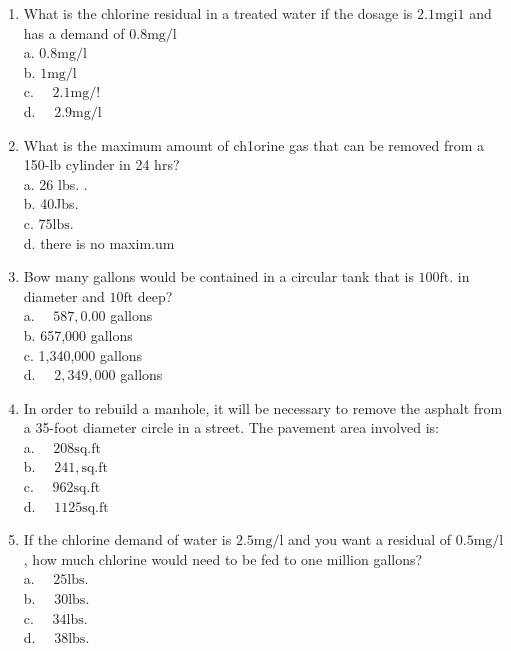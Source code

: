 \documentclass{article}
\begin{document}
\begin{enumerate}
\item What is the chlorine residual in a treated water if the dosage is $2.1 \mathrm{mgi1}$ and has a demand of $0.8 \mathrm{mg} / \mathrm{l}$\\
a. $0.8 \mathrm{mg} / \mathrm{l}$\\
b. $1 \mathrm{mg} / \mathrm{l}$\\
c. $\quad 2.1 \mathrm{mg} / !$\\
d. $\quad 2.9 \mathrm{mg} / \mathrm{l}$\\

\item What is the maximum amount of ch1orine gas that can be removed from a 150-lb cylinder in 24 hrs?\\
a. 26 lbs. .\\
b. 40Jbs.\\
c. $75 \mathrm{lbs}$.\\
d. there is no maxim.um\\

\item Bow many gallons would be contained in a circular tank that is $100 \mathrm{ft}$. in diameter and $10 \mathrm{ft}$ deep?\\
a. $\quad 587,0.00$ gallons\\
b. 657,000 gallons\\
c. 1,340,000 gallons\\
d. $\quad 2,349,000$ gallons\\


\item In order to rebuild a manhole, it will be necessary to remove the asphalt from a 35-foot diameter circle in a street. The pavement area involved is:\\
a. $\quad 208 \mathrm{sq. ft}$\\
b. $\quad 241, \mathrm{sq. ft}$\\
c. $\quad 962 \mathrm{sq. ft}$\\
d. $\quad 1125 \mathrm{sq. ft}$\\

\item If the chlorine demand of water is $2.5 \mathrm{mg} / \mathrm{l}$ and you want a residual of $0.5 \mathrm{mg} / \mathrm{l}$, how much chlorine would need to be fed to one million gallons?\\
a. $\quad 25 \mathrm{lbs}$.\\
b. $\quad 30 \mathrm{lbs}$.\\
c. $\quad 34 \mathrm{lbs}$.\\
d. $\quad 38 \mathrm{lbs}$.\\


\end{enumerate}
\end{document}
